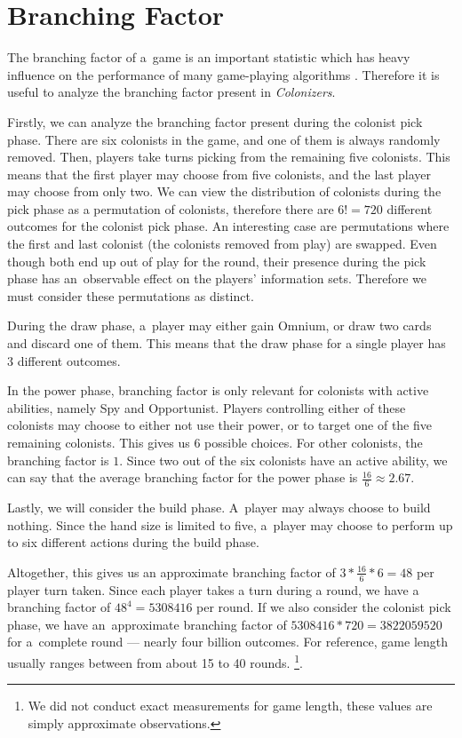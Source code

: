 \section{Branching Factor}
\label{sec:branching}

The branching factor of a~game is an important statistic which has heavy
influence on the performance of many game-playing algorithms \cite{Michalewicz04}.
Therefore it is useful to analyze the branching factor present in \emph{Colonizers}.

Firstly, we can analyze the branching factor present during the colonist pick phase.
There are six colonists in the game, and one of them is always randomly
removed. Then, players take turns picking from the remaining five colonists.
This means that the first player may choose from five colonists, and the last
player may choose from only two. We can view the distribution of colonists during the
pick phase as a permutation of colonists, therefore there are $6! = 720$
different outcomes for the colonist pick phase. An interesting case are permutations
where the first and last colonist (the colonists removed from play) are swapped.
Even though both end up out of play for the round, their presence during the pick
phase has an~observable effect on the players' information sets. Therefore we must
consider these permutations as distinct.

During the draw phase, a~player may either gain Omnium, or draw two cards and discard
one of them. This means that the draw phase for a single player has $3$ different outcomes.

In the power phase, branching factor is only relevant for colonists with active abilities,
namely Spy and Opportunist. Players controlling either of these colonists may choose
to either not use their power, or to target one of the five remaining colonists.
This gives us $6$ possible choices. For other colonists, the branching
factor is $1$. Since two out of the six colonists have an active ability,
we can say that the average branching factor for the power phase is
$\frac{16}{6} \approx 2.67$.

Lastly, we will consider the build phase. A~player may always choose to build nothing.
Since the hand size is limited to five, a~player may choose to perform up to six
different actions during the build phase.

Altogether, this gives us an approximate branching factor of $3 * \frac{16}{6} * 6 = 48$
per player turn taken. Since each player takes a turn during a round, we have
a branching factor of $48^{4} = 5 308 416$ per round. If we also consider the colonist pick phase,
we have an~approximate branching factor of $5 308 416 * 720 = 3 822 059 520$ for a~complete
round --- nearly four billion outcomes. For reference, game length usually ranges
between from about 15 to 40 rounds.
\footnote{We did not conduct exact measurements for game length, these values are simply
approximate observations.}.
